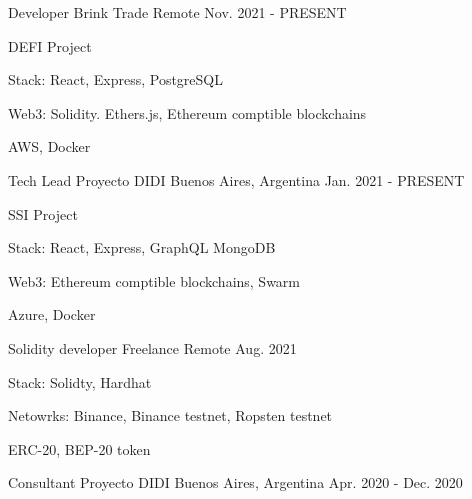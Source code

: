 


\begin{cventries}
\cventry
{Developer} %
{Brink Trade} %
{Remote} %
{Nov. 2021 - PRESENT} %
{ %
\begin{cvitems}
\item {DEFI Project}
\item {Stack: React, Express, PostgreSQL}
\item {Web3: Solidity. Ethers.js, Ethereum comptible blockchains}
\item {AWS, Docker}
\end{cvitems}
}
\cventry
{Tech Lead} %
{Proyecto DIDI} %
{Buenos Aires, Argentina} %
{Jan. 2021 - PRESENT} %
{ %
\begin{cvitems}
\item {SSI Project}
\item {Stack: React, Express, GraphQL MongoDB}
\item {Web3: Ethereum comptible blockchains, Swarm}
\item {Azure, Docker}
\end{cvitems}
}
\cventry
{Solidity developer} %
{Freelance} %
{Remote} %
{Aug. 2021} %
{ %
\begin{cvitems}
\item {Stack: Solidty, Hardhat}
\item {Netowrks: Binance, Binance testnet, Ropsten testnet}
\item {ERC-20, BEP-20 token}
\end{cvitems}
}
\cventry
{Consultant} %
{Proyecto DIDI} %
{Buenos Aires, Argentina} %
{Apr. 2020 - Dec. 2020} %

\end{cventries}
